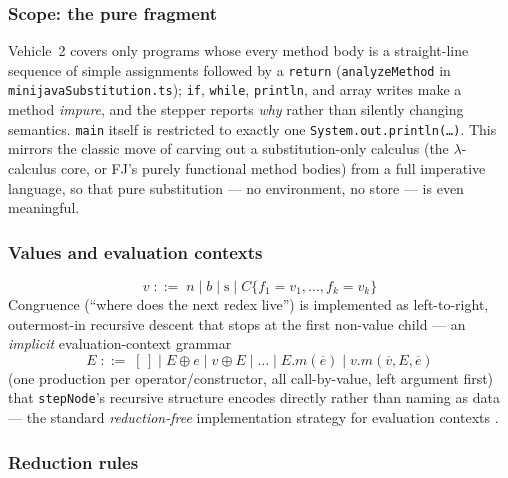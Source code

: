 \documentclass[11pt]{article}
\begin{document}
\subsubsection{Scope: the pure fragment}

Vehicle~2 covers only programs whose every method body is a straight-line
sequence of simple assignments followed by a \texttt{return}
(\texttt{analyzeMethod} in \texttt{minijavaSubstitution.ts}); \texttt{if},
\texttt{while}, \texttt{println}, and array writes make a method
\emph{impure}, and the stepper reports \emph{why} rather than silently
changing semantics. \texttt{main} itself is restricted to exactly one
\texttt{System.out.println(\ldots)}. This mirrors the classic move of
carving out a substitution-only calculus (the $\lambda$-calculus core, or
FJ's purely functional method bodies) from a full imperative language, so
that pure substitution --- no environment, no store --- is even meaningful.

\subsubsection{Values and evaluation contexts}

\[
  v \;::=\; n \mid b \mid \mathrm{s} \mid C\{f_1{=}v_1,\ldots,f_k{=}v_k\}
\]
Congruence (``where does the next redex live'') is implemented as
left-to-right, outermost-in recursive descent that stops at the first
non-value child --- an \emph{implicit} evaluation-context grammar
\[
  E \;::=\; [\,] \mid E \oplus e \mid v \oplus E \mid \ldots \mid E.m(\overline{e}) \mid v.m(\overline{v},E,\overline{e})
\]
(one production per operator/constructor, all call-by-value, left
argument first) that \texttt{stepNode}'s recursive structure encodes
directly rather than naming as data --- the standard \emph{reduction-free}
implementation strategy for evaluation contexts \cite{felleisenhieb1992}.

\subsubsection{Reduction rules}
\end{document}
